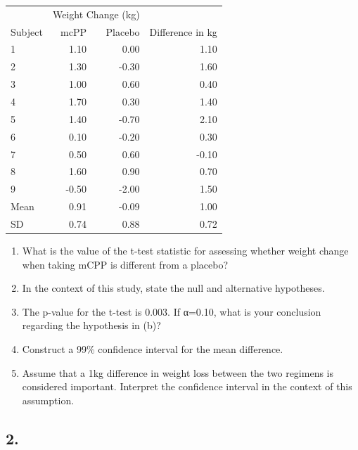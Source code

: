 \documentclass[
]{book}
\providecommand{\tightlist}{%
  \setlength{\itemsep}{0pt}\setlength{\parskip}{0pt}}
\begin{document}
\begin{table}
\centering
\begin{tabular}{l|r|r|r}
\hline
\multicolumn{1}{c|}{ } & \multicolumn{2}{c|}{Weight Change (kg)} & \multicolumn{1}{c}{ } \\
\cline{2-3}
Subject & mcPP & Placebo & Difference in kg\\
\hline
1 & 1.10 & 0.00 & 1.10\\
\hline
2 & 1.30 & -0.30 & 1.60\\
\hline
3 & 1.00 & 0.60 & 0.40\\
\hline
4 & 1.70 & 0.30 & 1.40\\
\hline
5 & 1.40 & -0.70 & 2.10\\
\hline
6 & 0.10 & -0.20 & 0.30\\
\hline
7 & 0.50 & 0.60 & -0.10\\
\hline
8 & 1.60 & 0.90 & 0.70\\
\hline
9 & -0.50 & -2.00 & 1.50\\
\hline
Mean & 0.91 & -0.09 & 1.00\\
\hline
SD & 0.74 & 0.88 & 0.72\\
\hline
\end{tabular}
\end{table}

\begin{enumerate}
\def\labelenumi{\alph{enumi})}
\tightlist
\item
  What is the value of the t-test statistic for assessing whether weight change when taking mCPP is different from a placebo?\\
\item
  In the context of this study, state the null and alternative hypotheses.\\
\item
  The p-value for the t-test is 0.003. If α=0.10, what is your conclusion regarding the hypothesis in (b)?\\
\item
  Construct a 99\% confidence interval for the mean difference.\\
\item
  Assume that a 1kg difference in weight loss between the two regimens is considered important. Interpret the confidence interval in the context of this assumption.
\end{enumerate}

\hypertarget{section-1}{%
\subsection{2.}\label{section-1}}
\end{document}
